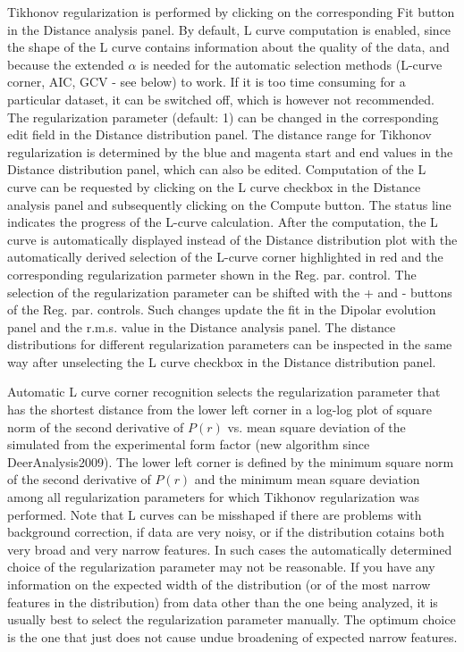 \documentclass{article}
\begin{document}
Tikhonov regularization is performed by clicking on the corresponding {\ttfamily Fit} button in the {\ttfamily Distance analysis} panel. By default, L curve computation is enabled, since the shape of the L curve contains information about the quality of the data, and because the extended $\alpha$ is needed for the automatic selection methods (L-curve corner, AIC, GCV - see below) to work. If it is too time consuming for a particular dataset, it can be switched off, which is however not recommended. The regularization parameter (default: 1) can be changed in the corresponding edit field in the {\ttfamily Distance distribution} panel. The distance range for Tikhonov regularization is determined by the blue and magenta start and end values in the {\ttfamily Distance distribution} panel, which can also be edited. Computation of the L curve can be requested by clicking on the {\ttfamily L curve} checkbox in the {\ttfamily Distance analysis} panel and subsequently clicking on the {\ttfamily Compute} button. The status line indicates the progress of the L-curve calculation. After the computation, the L curve is automatically displayed instead of the {\ttfamily Distance distribution} plot with the automatically derived selection of the L-curve corner highlighted in red and the corresponding regularization parmeter shown in the {\ttfamily Reg. par.} control. The selection of the regularization parameter can be shifted with the {\ttfamily +} and {\ttfamily -} buttons of the {\ttfamily Reg. par.} controls. Such changes update the fit in the {\ttfamily Dipolar evolution} panel and the r.m.s. value in the {\ttfamily Distance analysis} panel. The distance distributions for different regularization parameters can be inspected in the same way after unselecting the {\ttfamily L curve} checkbox in the {\ttfamily Distance distribution} panel.

Automatic L curve corner recognition selects the regularization parameter that has the shortest distance from the lower left corner in a log-log plot of square norm of the second derivative of $P(r)$ vs. mean square deviation of the simulated from the experimental form factor (new algorithm since DeerAnalysis2009). The lower left corner is defined by the minimum square norm of the second derivative of $P(r)$ and the minimum mean square deviation among all regularization parameters for which Tikhonov regularization was performed. Note that L curves can be misshaped if there are problems with background correction, if data are very noisy, or if the distribution cotains both very broad and very narrow features. In such cases the automatically determined choice of the regularization parameter may not be reasonable. If you have any information on the expected width of the distribution (or of the most narrow features in the distribution) from data other than the one being analyzed, it is usually best to select the regularization parameter manually. The optimum choice is the one that just does not cause undue broadening of expected narrow features.
\end{document}

